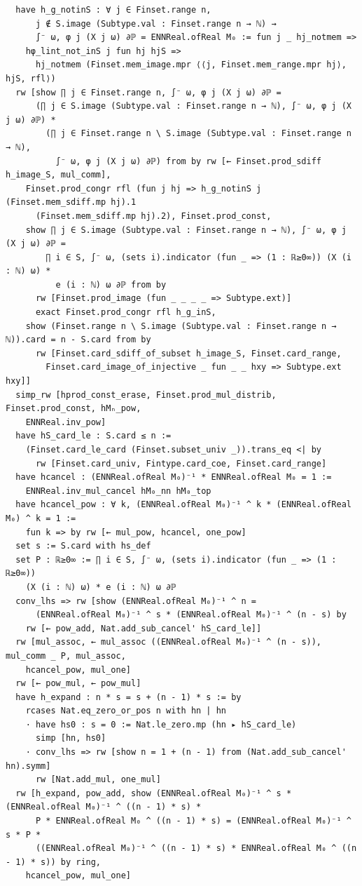\newpage
\begin{lstlisting}
  have h_g_notinS : ∀ j ∈ Finset.range n,
      j ∉ S.image (Subtype.val : Finset.range n → ℕ) →
      ∫⁻ ω, φ j (X j ω) ∂ℙ = ENNReal.ofReal M₀ := fun j _ hj_notmem =>
    hφ_lint_not_inS j fun hj hjS =>
      hj_notmem (Finset.mem_image.mpr ⟨⟨j, Finset.mem_range.mpr hj⟩, hjS, rfl⟩)
  rw [show ∏ j ∈ Finset.range n, ∫⁻ ω, φ j (X j ω) ∂ℙ =
      (∏ j ∈ S.image (Subtype.val : Finset.range n → ℕ), ∫⁻ ω, φ j (X j ω) ∂ℙ) *
        (∏ j ∈ Finset.range n \ S.image (Subtype.val : Finset.range n → ℕ),
          ∫⁻ ω, φ j (X j ω) ∂ℙ) from by rw [← Finset.prod_sdiff h_image_S, mul_comm],
    Finset.prod_congr rfl (fun j hj => h_g_notinS j (Finset.mem_sdiff.mp hj).1
      (Finset.mem_sdiff.mp hj).2), Finset.prod_const,
    show ∏ j ∈ S.image (Subtype.val : Finset.range n → ℕ), ∫⁻ ω, φ j (X j ω) ∂ℙ =
        ∏ i ∈ S, ∫⁻ ω, (sets i).indicator (fun _ => (1 : ℝ≥0∞)) (X (i : ℕ) ω) *
          e (i : ℕ) ω ∂ℙ from by
      rw [Finset.prod_image (fun _ _ _ _ => Subtype.ext)]
      exact Finset.prod_congr rfl h_g_inS,
    show (Finset.range n \ S.image (Subtype.val : Finset.range n → ℕ)).card = n - S.card from by
      rw [Finset.card_sdiff_of_subset h_image_S, Finset.card_range,
        Finset.card_image_of_injective _ fun _ _ hxy => Subtype.ext hxy]]
  simp_rw [hprod_const_erase, Finset.prod_mul_distrib, Finset.prod_const, hMₙ_pow,
    ENNReal.inv_pow]
  have hS_card_le : S.card ≤ n :=
    (Finset.card_le_card (Finset.subset_univ _)).trans_eq <| by
      rw [Finset.card_univ, Fintype.card_coe, Finset.card_range]
  have hcancel : (ENNReal.ofReal M₀)⁻¹ * ENNReal.ofReal M₀ = 1 :=
    ENNReal.inv_mul_cancel hM₀_nn hM₀_top
  have hcancel_pow : ∀ k, (ENNReal.ofReal M₀)⁻¹ ^ k * (ENNReal.ofReal M₀) ^ k = 1 :=
    fun k => by rw [← mul_pow, hcancel, one_pow]
  set s := S.card with hs_def
  set P : ℝ≥0∞ := ∏ i ∈ S, ∫⁻ ω, (sets i).indicator (fun _ => (1 : ℝ≥0∞))
    (X (i : ℕ) ω) * e (i : ℕ) ω ∂ℙ
  conv_lhs => rw [show (ENNReal.ofReal M₀)⁻¹ ^ n =
      (ENNReal.ofReal M₀)⁻¹ ^ s * (ENNReal.ofReal M₀)⁻¹ ^ (n - s) by
    rw [← pow_add, Nat.add_sub_cancel' hS_card_le]]
  rw [mul_assoc, ← mul_assoc ((ENNReal.ofReal M₀)⁻¹ ^ (n - s)), mul_comm _ P, mul_assoc,
    hcancel_pow, mul_one]
  rw [← pow_mul, ← pow_mul]
  have h_expand : n * s = s + (n - 1) * s := by
    rcases Nat.eq_zero_or_pos n with hn | hn
    · have hs0 : s = 0 := Nat.le_zero.mp (hn ▸ hS_card_le)
      simp [hn, hs0]
    · conv_lhs => rw [show n = 1 + (n - 1) from (Nat.add_sub_cancel' hn).symm]
      rw [Nat.add_mul, one_mul]
  rw [h_expand, pow_add, show (ENNReal.ofReal M₀)⁻¹ ^ s * (ENNReal.ofReal M₀)⁻¹ ^ ((n - 1) * s) *
      P * ENNReal.ofReal M₀ ^ ((n - 1) * s) = (ENNReal.ofReal M₀)⁻¹ ^ s * P *
      ((ENNReal.ofReal M₀)⁻¹ ^ ((n - 1) * s) * ENNReal.ofReal M₀ ^ ((n - 1) * s)) by ring,
    hcancel_pow, mul_one]


\end{lstlisting}
